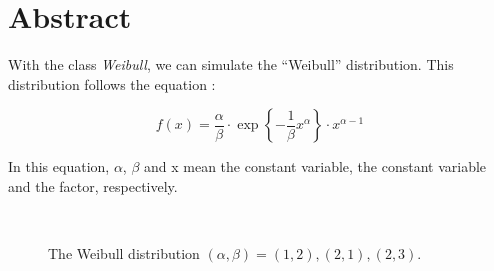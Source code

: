 %

\section{Abstract}

\noindent
With the class {\em Weibull}, we can simulate the ``Weibull''
distribution. This distribution follows the equation :

\begin{equation}
f(x) = \frac{\alpha}{\beta} \cdot \exp \left\{ - \frac{1}{\beta} x^\alpha \right\} \cdot x^{\alpha-1}
\end{equation}

\noindent
In this equation, $\alpha$, $\beta$ and x mean the constant variable, the constant
variable and the factor, respectively.

\vspace*{10mm}

\begin{center}
\begin{figure}[h]
\\
\caption{The Weibull distribution $(\alpha ,\beta
)=(1,2),(2,1),(2,3)$.}
\end{figure}
\end{center}


